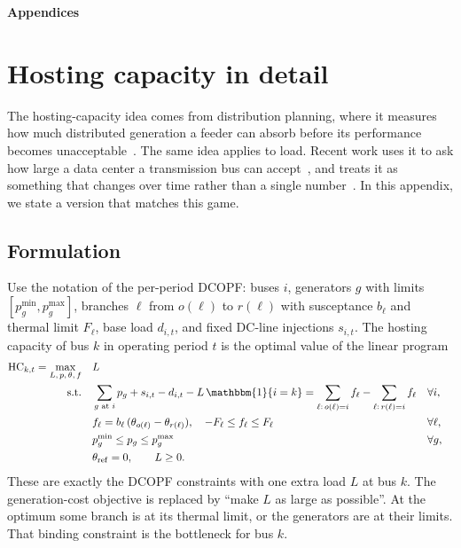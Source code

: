 \documentclass[10pt]{article}
\begin{document}
\clearpage
\appendix
\begin{center}
{\LARGE\bfseries Appendices}
\end{center}
\vspace{0.5em}

\section{Hosting capacity in detail}\label{app:hc}

The hosting-capacity idea comes from distribution planning, where it measures
how much distributed generation a feeder can absorb before its performance
becomes unacceptable~\cite{bollen2011integration}. The same idea applies to
load. Recent work uses it to ask how large a data center a transmission bus can
accept~\cite{wan2026hosting}, and treats it as something that changes over
time rather than a single number~\cite{deoliveira2019dynamic}. In this appendix, we 
state a version that matches this game.

\subsection{Formulation}
Use the notation of the per-period DCOPF: buses $i$, generators $g$ with limits
$[p_g^{\min}, p_g^{\max}]$, branches $\ell$ from $o(\ell)$ to $r(\ell)$ with
susceptance $b_\ell$ and thermal limit $F_\ell$, base load $d_{i,t}$, and fixed
DC-line injections $s_{i,t}$. The hosting capacity of bus $k$ in operating period $t$ is
the optimal value of the linear program
\begin{align*}
  \mathrm{HC}_{k,t} = \max_{L,\,p,\,\theta,\,f} \quad & L\\
  \text{s.t.}\quad
  & \sum_{g \text{ at } i} p_g + s_{i,t} - d_{i,t} - L\,\mathbbm{1}\{i=k\}
    = \sum_{\ell:\,o(\ell)=i} f_\ell - \sum_{\ell:\,r(\ell)=i} f_\ell
    && \forall i,\\
  & f_\ell = b_\ell\,(\theta_{o(\ell)} - \theta_{r(\ell)}),\quad
    -F_\ell \le f_\ell \le F_\ell && \forall \ell,\\
  & p_g^{\min} \le p_g \le p_g^{\max} && \forall g,\\
  & \theta_{\mathrm{ref}} = 0,\qquad L \ge 0 .
\end{align*}
These are exactly the DCOPF constraints with one extra load $L$ at bus $k$. The
generation-cost objective is replaced by ``make $L$ as large as possible''.
At the optimum some branch is at its thermal limit, or the generators are at
their limits. That binding constraint is the bottleneck for bus $k$.
\end{document}
